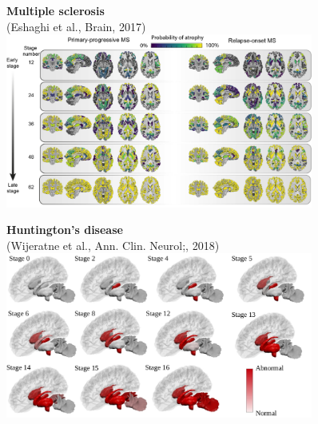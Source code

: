 \documentclass[8pt,xcolor=table,aspectratio=169]{beamer}
\begin{document}
\begin{frame}
\begin{small}
\begin{figure}[h]
    \begin{minipage}[t][\mnpHeight][t]{0.4\linewidth}
  \centering
    \textbf{Multiple sclerosis}\\ \footnotesize{(Eshaghi et al., Brain, 2017)}\\    
    \includegraphics[width=0.9\textwidth,trim=0 0 0 0,clip]{ms_arman}
      \vspace{1em}
  \end{minipage}
  \begin{minipage}[t][\mnpHeight][t]{0.4\linewidth}
    \centering
    \textbf{Huntington's disease}\\ \footnotesize{(Wijeratne et al., Ann. Clin. Neurol;, 2018)}
    \includegraphics[width=0.9\textwidth,trim=0 0 0 0, clip]{hd_peter}
  \end{minipage}

\end{figure}
  \end{small}
  
  



\end{frame}
\end{document}
